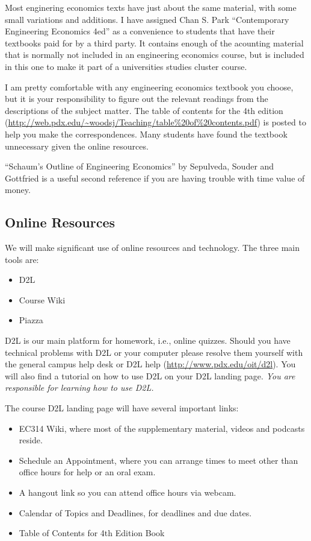 \documentclass[letterpaper,10pt]{article}
\newif\ifonline
\begin{document}
Most enginering economics texts have just about the same material, with some small variations and additions. I have assigned Chan S. Park ``Contemporary Engineering Economics
4ed'' as a convenience to students that have their textbooks paid for by a third party. It contains enough of the acounting material that is normally not included in an engineering economics course, but is included in this one to make it part of a universities studies cluster course. 


I am pretty comfortable with any engineering economics textbook you choose, but it is your responsibility to figure
out the relevant readings from the descriptions of the subject matter.
The table of contents for the 4th edition (\url{http://web.pdx.edu/~woodsj/Teaching/table\%20of\%20contents.pdf}) is posted to help you
make the correspondences.  Many students have found the textbook unnecessary given the online resources.

``Schaum's Outline of Engineering Economics'' by Sepulveda, Souder and Gottfried is a useful second reference if you are having trouble with time value of money.

\subsection{Online Resources}
We will make significant use of online resources and technology.  The
three main tools are:
\begin{itemize}
\item D2L
\item Course Wiki
\item Piazza
\end{itemize}

D2L is our main platform for homework, i.e., online quizzes.  Should you have technical problems with D2L
or your computer please resolve them yourself with the general campus
help desk or D2L help (\url{http://www.pdx.edu/oit/d2l}).  You will
also find a tutorial on how to use D2L on your D2L landing page.
\emph{You are responsible for learning how to use D2L.}


The course D2L landing page will have several important links:
\begin{itemize}
  \item EC314 Wiki, where most of the supplementary material, videos and
    podcasts reside.
  \ifonline
    \item Schedule an Appointment, where you can arrange times to meet
    other than office hours for help.
    \else
    \item Schedule an Appointment, where you can arrange times to meet
    other than office hours for help or an oral exam.  
  \fi
  
  \item A hangout link so you can attend office hours via webcam.
  \item Calendar of Topics and Deadlines, for deadlines and due dates.
  \item Table of Contents for 4th Edition Book
\end{itemize}
\end{document}
